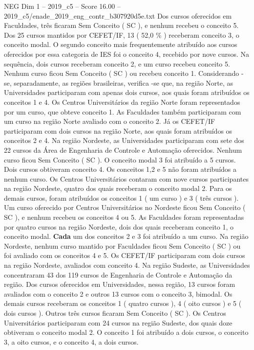 \begin{textsample}{NEG Dim 1 – 2019\_c5 – Score 16.00 – 2019\_c5/enade\_2019\_eng\_contr\_b307920d5e.txt}
Dos cursos oferecidos em Faculdades, três ficaram Sem Conceito ( SC ), e nenhum recebeu o conceito 5.
Dos 25 cursos mantidos por CEFET/IF, 13 ( 52,0 \% ) receberam conceito 3, o conceito modal.
O segundo conceito mais frequentemente atribuído aos cursos oferecidos por essa categoria de IES foi o conceito 4, recebido por nove cursos.
Na sequência, dois cursos receberam conceito 2, e um curso recebeu conceito 5.
Nenhum curso ficou Sem Conceito ( SC ) ou recebeu conceito 1.
Considerando -se, separadamente, as regiões brasileiras, verifica -se que, na região Norte, as Universidades participaram com apenas dois cursos, aos quais foram atribuídos os conceitos 1 e 4.
Os Centros Universitários da região Norte foram representados por um curso, que obteve conceito 1.
As Faculdades também participaram com um curso na região Norte avaliado com o conceito 2.
Já os CEFET/IF participaram com dois cursos na região Norte, aos quais foram atribuídos os conceitos 2 e 4.
Na região Nordeste, as Universidades participaram com sete dos 22 cursos da Área de Engenharia de Controle e Automação oferecidos.
Nenhum curso ficou Sem Conceito ( SC ).
O conceito modal 3 foi atribuído a 5 cursos.
Dois cursos obtiveram conceito 4.
Os conceitos 1,2 e 5 não foram atribuídos a nenhum curso.
Os Centros Universitários contaram com nove cursos participantes na região Nordeste, quatro dos quais receberam o conceito modal 2.
Para os demais cursos, foram atribuídos os conceitos 1 ( um curso ) e 3 ( três cursos ).
Um curso oferecido por Centros Universitários no Nordeste ficou Sem Conceito ( SC ), e nenhum recebeu os conceitos 4 ou 5.
As Faculdades foram representadas por quatro cursos na região Nordeste, dois dos quais receberam conceito 1, o conceito modal. \textbf{Cada} um dos conceitos 2 e 3 foi atribuído a um curso.
Na região Nordeste, nenhum curso mantido por Faculdades ficou Sem Conceito ( SC ) ou foi avaliado com os conceitos 4 e 5.
Os CEFET/IF participaram com dois cursos na região Nordeste, avaliados com conceito 4.
Na região Sudeste, as Universidades concentraram 43 dos 119 cursos de Engenharia de Controle e Automação da região.
Dos cursos oferecidos em Universidades, nessa região, 13 cursos foram avaliados com o conceito 2 e outros 13 cursos com o conceito 3, bimodal.
Os demais cursos receberam os conceitos 1 ( quatro cursos ), 4 ( oito cursos ) e 5 ( dois cursos ).
Outros três cursos ficaram Sem Conceito ( SC ).
Os Centros Universitários participaram com 24 cursos na região Sudeste, dos quais doze obtiveram o conceito modal 2.
O conceito 1 foi atribuído a dois cursos, o conceito 3, a oito cursos, e o conceito 4, a dois cursos.

\end{textsample}
